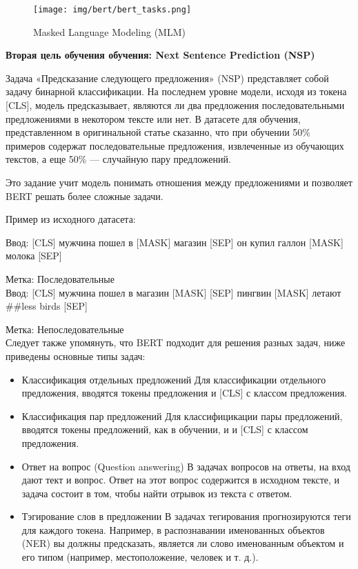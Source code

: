 \documentclass[PMI,VKR]{HSEUniversity}
\begin{document}
\begin{figure}[h]
    \centering
    \texttt{[image: img/bert/bert\_tasks.png]}
    \caption{Masked Language Modeling (MLM)}
\end{figure}
\newpage
\begin{center}
    \textbf{Вторая цель обучения обучения: Next Sentence Prediction (NSP)}
\end{center}

Задача «Предсказание следующего предложения» (NSP) представляет собой задачу бинарной классификации. На последнем уровне модели, исходя из токена [CLS], модель предсказывает, являются ли два предложения последовательными предложениями в некотором тексте или нет. В датасете для обучения, представленном в оригинальной статье сказанно, что при обучении 50\% примеров содержат последовательные предложения, извлеченные из обучающих текстов, а еще 50\% — случайную пару предложений.

Это задание учит модель понимать отношения между предложениями и позволяет BERT решать более сложные задачи.

\begin{center}
    Пример из исходного датасета:
\end{center}

Ввод: [CLS] мужчина пошел в [MASK] магазин [SEP] он купил галлон [MASK] молока [SEP]

Метка: Последовательные \\

Ввод: [CLS] мужчина пошел в магазин [MASK] [SEP] пингвин [MASK] летают \#\#less birds [SEP]

Метка: Непоследовательные\\

Следует также упомянуть, что BERT подходит для решения разных задач, ниже приведены основные типы задач:

\begin{itemize}
    \item Классификация отдельных предложений
          Для классификации отдельного предложения, вводятся токены предложения и [CLS] с классом предложения.
    \item Классификация пар предложений
          Для классифицикации пары предложений, вводятся токены предложений, как в обучении, и и [CLS] с классом предложения.
    \item Ответ на вопрос (Question answering)
          В задачах вопросов на ответы, на вход дают тект и вопрос. Ответ на этот вопрос содержится в исходном тексте, и задача состоит в том, чтобы найти отрывок из текста с ответом.
    \item Тэгирование слов в предложении
          В задачах тегирования прогнозируются теги для каждого токена. Например, в распознавании именованных объектов (NER) вы должны предсказать, является ли слово именованным объектом и его типом (например, местоположение, человек и т. д.).
\end{itemize}
\end{document}

